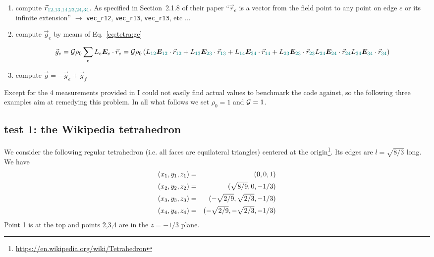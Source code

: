 \begin{enumerate}
\item compute $\vec{r}_{\color{teal}12,13,14,23,24,34}$. As specified in Section~2.1.8 of their 
paper ``$\vec{r}_e$ is a vector from the field point to any point on edge $e$ or its infinite extension''
$\rightarrow$ \verb|vec_r12|, \verb|vec_r13|, \verb|vec_r13|, etc ...  


\item compute $\vec{g}_e$ by means of Eq.~\eqref{eq:tetra:ge}

\[
\vec{g}_e 
={\cal G} \rho_0 \sum_e L_e {\bm E}_e \cdot \vec{r}_e 
={\cal G} \rho_0 \left( 
L_{\color{teal}12} {\bm E}_{\color{teal}12}\cdot\vec{r}_{\color{teal}12} +
L_{\color{teal}13} {\bm E}_{\color{teal}23}\cdot\vec{r}_{\color{teal}13} +
L_{\color{teal}14} {\bm E}_{\color{teal}34}\cdot\vec{r}_{\color{teal}14} +
L_{\color{teal}23} {\bm E}_{\color{teal}23}\cdot\vec{r}_{\color{teal}23} 
L_{\color{teal}24} {\bm E}_{\color{teal}24}\cdot\vec{r}_{\color{teal}24} 
L_{\color{teal}34} {\bm E}_{\color{teal}34}\cdot\vec{r}_{\color{teal}34} 
\right)
\]


\item compute $\vec{g}=-\vec{g}_e+\vec{g}_f$

\end{enumerate}

Except for the 4 measurements provided in \textcite{mequ86} I could not easily find 
actual values to benchmark the code against, so the following three examples aim at 
remedying this problem. 
In all what follows we set $\rho_0=1$ and ${\cal G}=1$.

\subsection*{test 1: the Wikipedia tetrahedron}

We consider the following regular tetrahedron (i.e. all faces are equilateral triangles) centered at the 
origin\footnote{\url{https://en.wikipedia.org/wiki/Tetrahedron}}. Its edges are $l=\sqrt{8/3}$ long.
We have
\begin{eqnarray}
(x_1,y_1,z_1) &=& (0,0,1) \nonumber\\
(x_2,y_2,z_2) &=& (\sqrt{8/9},0,-1/3) \nonumber\\
(x_3,y_3,z_3) &=& (-\sqrt{2/9},\sqrt{2/3},-1/3) \nonumber\\
(x_4,y_4,z_4) &=& (-\sqrt{2/9},-\sqrt{2/3},-1/3) \nonumber
\end{eqnarray}
Point 1 is at the top and points 2,3,4 are in the $z=-1/3$ plane.

